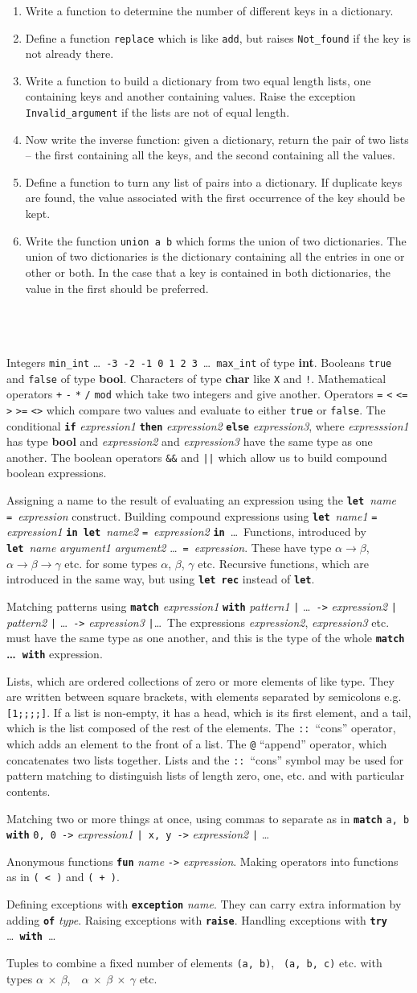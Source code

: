 \documentclass[]{book}
\makeatletter
\newcommand\upquote[1]{\textquotesingle#1\textquotesingle}
\newcommand{\sofarstartingoff}{

\noindent 1

\noindent Integers \texttt{min\_int} \ldots\ \texttt{-3}\ \texttt{-2}\ \texttt{-1}\ \texttt{0}\ \texttt{1}\ \texttt{2}\ \texttt{3}\ \ldots\ \texttt{max\_int} of type \textbf{\textrm{int}}. Booleans \texttt{true} and \texttt{false} of type \textbf{\textrm{bool}}. \noindent Characters of type \textrm{\textbf{char}} like \texttt{\upquote{X}} and \texttt{\upquote{!}}. Mathematical operators \texttt{+} \texttt{-} \texttt{*} \texttt{/} \texttt{mod} which take two integers and give another. Operators \texttt{=} \texttt{<} \texttt{<=} \texttt{>} \texttt{>=} \texttt{<>} which compare two values and evaluate to either \texttt{true} or \texttt{false}. The conditional \textbf{\texttt{if}} \textit{expression1} \textbf{\texttt{then}} \textit{expression2} \textbf{\texttt{else}} \textit{expression3}, where \textit{expresssion1} has type \textrm{\textbf{bool}} and \textit{expression2} and \textit{expression3} have the same type as one another. The boolean operators \texttt{\&\&} and \texttt{||} which allow us to build compound boolean expressions.}
\newcommand{\sofarfunctions}
{
\noindent 2

\noindent Assigning a name to the result of evaluating an expression using the \textbf{\texttt{let}}\ \textit{name} \texttt{=}\ \textit{expression} construct. Building compound expressions using \textbf{\texttt{let}}\ \textit{name1} \texttt{=} \textit{expression1} \textbf{\texttt{in}}\ \textbf{\texttt{let}}\ \textit{name2} \texttt{=}\ \textit{expression2} \textbf{\texttt{in}}\ \ldots \ Functions, introduced by \textbf{\texttt{let}}\ \textit{name} \textit{argument1} \textit{argument2} \ldots\ \texttt{=}\ \textit{expression}. These have type $\alpha \rightarrow \beta$, $\alpha \rightarrow \beta \rightarrow \gamma$ etc. for some types $\alpha$, $\beta$, $\gamma$ etc. Recursive functions, which are introduced in the same way, but using \textbf{\texttt{let rec}} instead of \textbf{\texttt{let}}.}
\newcommand{\sofarcasebycase}
{\noindent 3

\noindent Matching patterns using \textbf{\texttt{match}} \textit{expression1} \textbf{\texttt{with}} \textit{pattern1} \texttt{|} \ldots\ \texttt{->} \textit{expression2} \texttt{|} \textit{pattern2} \texttt{|} \ldots\ \texttt{->} \textit{expression3} \texttt{|}\ldots \ The expressions \textit{expression2}, \textit{expression3} etc. must have the same type as one another, and this is the type of the whole \textbf{\texttt{match} \ldots\ \texttt{with}} expression.}
\newcommand{\sofarlistingthings}
{
\noindent 4

\noindent Lists, which are ordered collections of zero or more elements of like type. They are written between square brackets, with elements separated by semicolons e.g. \texttt{[1;\! 2;\! 3;\! 4;\! 5]}. If a list is non-empty, it has a head, which is its first element, and a tail, which is the list composed of the rest of the elements. The \texttt{::}\ ``cons'' operator, which adds an element to the front of a list. The \texttt{@} ``append'' operator, which concatenates two lists together. Lists and the \texttt{::}\ ``cons'' symbol may be used for pattern matching to distinguish lists of length zero, one, etc. and with particular contents.}
\newcommand{\sofarsortingthings}
{
\noindent 5

\noindent Matching two or more things at once, using commas to separate as in \texttt{\textbf{match}} \texttt{a, b} \textbf{\texttt{with}} \texttt{0, 0 ->} \textit{expression1} \texttt{|\ x, y ->} \textit{expression2} \texttt{|} \ldots
}
\newcommand{\sofarfunctionsuponfunctions}
{
\noindent 6

\noindent Anonymous functions \textbf{\texttt{fun}} \textit{name} \texttt{->} \textit{expression}. Making operators into functions as in \texttt{(\! <\! )} and \texttt{(\! +\! )}.
}
\newcommand{\sofarwhenthingsgowrong}
{
\noindent 7

\noindent Defining exceptions with \textbf{\texttt{exception}} \textit{name}. They can carry extra information by adding \textbf{\texttt{of}} \textit{type}. Raising exceptions with \textbf{\texttt{raise}}. Handling exceptions with \textbf{\texttt{try}} \ldots\ \textbf{\texttt{with}}\ \ldots}
\newcommand{\sofarlookingthingsup}
{
\noindent 8

\noindent Tuples to combine a fixed number of elements \texttt{(a,\! b)},\!    \ \texttt{(a,\! b,\! c)} etc. with types \textrm{\textbf{$\alpha$ $\times$ $\beta$}},\ \  \textrm{\textbf{$\alpha$ $\times$ $\beta$ $\times$ $\gamma$}} etc.
}
\makeatother
\begin{document}
\begin{enumerate}
\item Write a function to determine the number of different keys in a dictionary.

\item Define a function \texttt{replace} which is like \texttt{add}, but raises \texttt{Not\_found} if the key is not already there.

\item Write a function to build a dictionary from two equal length lists, one containing keys and another containing values. Raise the exception \texttt{Invalid\_argument} if the lists are not of equal length.

\item Now write the inverse function: given a dictionary, return the pair of two lists -- the first containing all the keys, and the second containing all the values.

\item Define a function to turn any list of pairs into a dictionary. If duplicate keys are found, the value associated with the first occurrence of the key should be kept.

\item Write the function \texttt{union\! a\! b} which forms the union of two dictionaries. The union of two dictionaries is the dictionary containing all the entries in one or other or both. In the case that a key is contained in both dictionaries, the value in the first should be preferred. 

\end{enumerate}


\cleardoublepage
\thispagestyle{empty}
\chapter*{}
\\

{\footnotesize
\sofarstartingoff

\vspace{\baselineskip}
\sofarfunctions

\vspace{\baselineskip}
\sofarcasebycase

\vspace{\baselineskip}
\sofarlistingthings

\vspace{\baselineskip}
\sofarsortingthings

\vspace{\baselineskip}
\sofarfunctionsuponfunctions

\vspace{\baselineskip}
\sofarwhenthingsgowrong

\vspace{\baselineskip}
\sofarlookingthingsup
}
\end{document}

